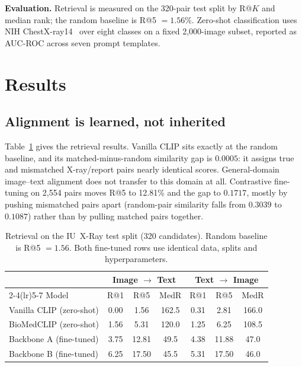 \documentclass[runningheads]{llncs}
\begin{document}
\textbf{Evaluation.} Retrieval is measured on the 320-pair test split by R@$K$
and median rank; the random baseline is R@5 $=1.56\%$. Zero-shot classification
uses NIH ChestX-ray14~\cite{wang2017chestxray14} over eight classes on a fixed
2{,}000-image subset, reported as AUC-ROC across seven prompt templates.

\section{Results}

\subsection{Alignment is learned, not inherited}

Table~\ref{tab:retrieval} gives the retrieval results. Vanilla CLIP sits exactly
at the random baseline, and its matched-minus-random similarity gap is $0.0005$:
it assigns true and mismatched X-ray/report pairs nearly identical scores.
General-domain image--text alignment does not transfer to this domain at all.
Contrastive fine-tuning on 2{,}554 pairs moves R@5 to 12.81\% and the gap to
$0.1717$, mostly by pushing mismatched pairs apart (random-pair similarity falls
from $0.3039$ to $0.1087$) rather than by pulling matched pairs together.

\begin{table}[t]
\centering
\caption{Retrieval on the IU~X-Ray test split (320 candidates). Random baseline
is R@5 $=1.56$. Both fine-tuned rows use identical data, splits and
hyperparameters.}
\label{tab:retrieval}
\begin{tabular}{lcccccc}
\toprule
& \multicolumn{3}{c}{Image $\rightarrow$ Text} & \multicolumn{3}{c}{Text $\rightarrow$ Image} \\
\cmidrule(lr){2-4}\cmidrule(lr){5-7}
Model & R@1 & R@5 & MedR & R@1 & R@5 & MedR \\
\midrule
Vanilla CLIP (zero-shot)        & 0.00 & 1.56  & 162.5 & 0.31 & 2.81  & 166.0 \\
BioMedCLIP (zero-shot)          & 1.56 & 5.31  & 120.0 & 1.25 & 6.25  & 108.5 \\
Backbone A (fine-tuned)         & 3.75 & 12.81 & 49.5  & 4.38 & 11.88 & 47.0 \\
Backbone B (fine-tuned)         & 6.25 & 17.50 & 45.5  & 5.31 & 17.50 & 46.0 \\
\bottomrule
\end{tabular}
\end{table}
\end{document}
